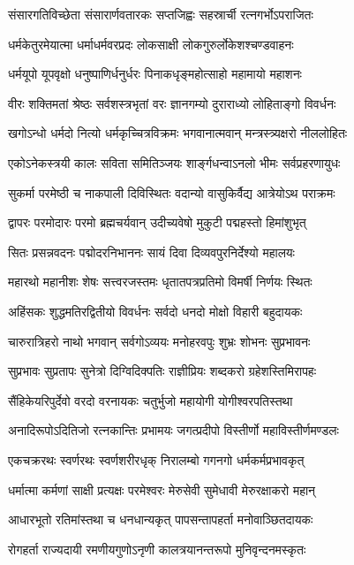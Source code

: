 \twolineshloka
{संसारगतिविच्छेता संसारार्णवतारकः}
{सप्तजिह्वः सहस्रार्ची रत्नगर्भोऽपराजितः}%

\twolineshloka
{धर्मकेतुरमेयात्मा धर्माधर्मवरप्रदः}
{लोकसाक्षी लोकगुरुर्लोकेशश्चण्डवाहनः}%

\twolineshloka
{धर्मयूपो यूपवृक्षो धनुष्पाणिर्धनुर्धरः}
{पिनाकधृङ्महोत्साहो महामायो महाशनः}%

\twolineshloka
{वीरः शक्तिमतां श्रेष्ठः सर्वशस्त्रभृतां वरः}
{ज्ञानगम्यो दुराराध्यो लोहिताङ्गो विवर्धनः}%

\twolineshloka
{खगोऽन्धो धर्मदो नित्यो धर्मकृच्चित्रविक्रमः}
{भगवानात्मवान् मन्त्रस्त्र्यक्षरो नीललोहितः}%

\twolineshloka
{एकोऽनेकस्त्रयी कालः सविता समितिञ्जयः}
{शार्ङ्गधन्वाऽनलो भीमः सर्वप्रहरणायुधः}%

\twolineshloka
{सुकर्मा परमेष्ठी च नाकपाली दिविस्थितः}
{वदान्यो वासुकिर्वैद्य आत्रेयोऽथ पराक्रमः}%

\twolineshloka
{द्वापरः परमोदारः परमो ब्रह्मचर्यवान्}
{उदीच्यवेषो मुकुटी पद्महस्तो हिमांशुभृत्}%

\twolineshloka
{सितः प्रसन्नवदनः पद्मोदरनिभाननः}
{सायं दिवा दिव्यवपुरनिर्देश्यो महालयः}%

\twolineshloka
{महारथो महानीशः शेषः सत्त्वरजस्तमः}
{धृतातपत्रप्रतिमो विमर्षी निर्णयः स्थितः}%

\twolineshloka
{अहिंसकः शुद्धमतिरद्वितीयो विवर्धनः}
{सर्वदो धनदो मोक्षो विहारी बहुदायकः}%

\twolineshloka
{चारुरात्रिहरो नाथो भगवान् सर्वगोऽव्ययः}
{मनोहरवपुः शुभ्रः शोभनः सुप्रभावनः}%

\twolineshloka
{सुप्रभावः सुप्रतापः सुनेत्रो दिग्विदिक्पतिः}
{राज्ञीप्रियः शब्दकरो ग्रहेशस्तिमिरापहः}%

\twolineshloka
{सैंहिकेयरिपुर्देवो वरदो वरनायकः}
{चतुर्भुजो महायोगी योगीश्वरपतिस्तथा}%

\twolineshloka
{अनादिरूपोऽदितिजो रत्नकान्तिः प्रभामयः}
{जगत्प्रदीपो विस्तीर्णो महाविस्तीर्णमण्डलः}%

\twolineshloka
{एकचक्ररथः स्वर्णरथः स्वर्णशरीरधृक्}
{निरालम्बो गगनगो धर्मकर्मप्रभावकृत्}%

\twolineshloka
{धर्मात्मा कर्मणां  साक्षी प्रत्यक्षः परमेश्वरः}
{मेरुसेवी सुमेधावी मेरुरक्षाकरो महान्}%

\twolineshloka
{आधारभूतो रतिमांस्तथा च धनधान्यकृत्}
{पापसन्तापहर्ता मनोवाञ्छितदायकः}%

\twolineshloka
{रोगहर्ता राज्यदायी रमणीयगुणोऽनृणी}
{कालत्रयानन्तरूपो मुनिवृन्दनमस्कृतः}%

